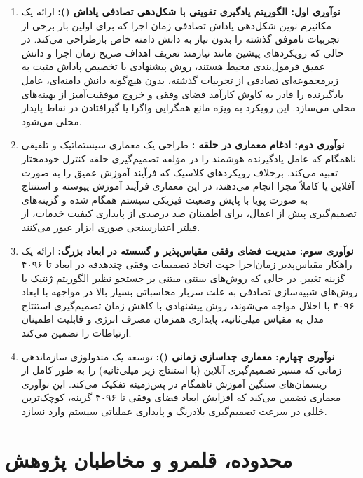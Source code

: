 \documentclass[oneside,openany,phd]{TMU-Thesis}
\begin{document}
\begin{enumerate}
  \item \textbf{نوآوری اول: الگوریتم یادگیری تقویتی با شکل‌دهی تصادفی پاداش ():} 
  ارائه یک مکانیزم نوین شکل‌دهی پاداش تصادفی زمان اجرا که برای اولین بار برخی از تجربیات ناموفق گذشته را بدون نیاز به دانش دامنه خاص بازطراحی می‌کند. در حالی که رویکردهای پیشین مانند  \cite{andrychowicz2017her} نیازمند تعریف اهداف صریح زمان اجرا و دانش عمیق فرمول‌بندی محیط هستند، روش پیشنهادی با تخصیص پاداش مثبت به زیرمجموعه‌ای تصادفی از تجربیات گذشته، بدون هیچ‌گونه دانش دامنه‌ای، عامل یادگیرنده را قادر به کاوش کارآمد فضای وفقی و خروج موفقیت‌آمیز از بهینه‌های محلی می‌سازد. این رویکرد به ویژه مانع همگرایی واگرا یا گیرافتادن در نقاط پایدار محلی می‌شود.
  
  \item \textbf{نوآوری دوم: ادغام معماری  در حلقه :} 
  طراحی یک معماری سیستماتیک و تلفیقی ناهمگام که عامل یادگیرنده هوشمند را در مؤلفه تصمیم‌گیری حلقه کنترل خودمختار تعبیه می‌کند. برخلاف رویکردهای کلاسیک که فرآیند آموزش عمیق را به صورت آفلاین یا کاملاً مجزا انجام می‌دهند، در این معماری فرآیند آموزش پیوسته و استنتاج به صورت پویا با پایش وضعیت فیزیکی سیستم همگام شده و گزینه‌های تصمیم‌گیری پیش از اعمال، برای اطمینان صد درصدی از پایداری کیفیت خدمات، از فیلتر اعتبارسنجی صوری ابزار  عبور می‌کنند.
  
  \item \textbf{نوآوری سوم: مدیریت فضای وفقی مقیاس‌پذیر و گسسته در ابعاد بزرگ:} 
  ارائه یک راهکار مقیاس‌پذیر زمان‌اجرا جهت اتخاذ تصمیمات وفقی چندهدفه در ابعاد تا ۴۰۹۶ گزینه تغییر. در حالی که روش‌های سنتی مبتنی بر جستجو نظیر الگوریتم ژنتیک یا روش‌های شبیه‌سازی تصادفی به علت سربار محاسباتی بسیار بالا در مواجهه با ابعاد ۴۰۹۶ با اخلال مواجه می‌شوند، روش پیشنهادی با کاهش زمان تصمیم‌گیری استنتاج مدل به مقیاس میلی‌ثانیه، پایداری همزمان مصرف انرژی و قابلیت اطمینان ارتباطات را تضمین می‌کند.

  \item \textbf{نوآوری چهارم: معماری جداسازی زمانی ():}
  توسعه یک متدولوژی سازماندهی زمانی که مسیر تصمیم‌گیری آنلاین (با استنتاج زیر میلی‌ثانیه) را به طور کامل از ریسمان‌های سنگین آموزش ناهمگام در پس‌زمینه تفکیک می‌کند. این نوآوری معماری تضمین می‌کند که افزایش ابعاد فضای وفقی تا ۴۰۹۶ گزینه، کوچک‌ترین خللی در سرعت تصمیم‌گیری بلادرنگ و پایداری عملیاتی سیستم وارد نسازد.
\end{enumerate}

\section*{محدوده، قلمرو و مخاطبان پژوهش}
\end{document}
